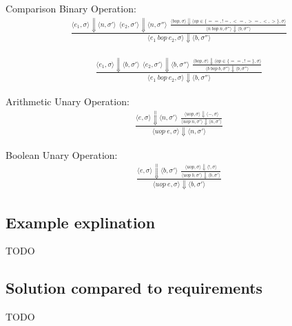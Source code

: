 \documentclass[12pt]{article}
\begin{document}
	Comparison Binary Operation:
	\begin{align*}
		\frac{
		\langle e_1, \sigma \rangle\Downarrow \langle n, \sigma' \rangle \ \ 
		\langle e_2, \sigma' \rangle\Downarrow \langle n, \sigma'' \rangle \ \
		\frac{
			\langle bop, \sigma \rangle\Downarrow \langle op \in \{==, !=, <=, >=, <, >\} , \sigma \rangle
		}{
			\langle n\ bop\ n, \sigma'' \rangle\Downarrow \langle b, \sigma'' \rangle
		}}
		{\langle e_1\ bop\ e_2, \sigma \rangle\Downarrow \langle b, \sigma'' \rangle}
	\end{align*}
	
	\begin{align*}
		\frac{
		\langle e_1, \sigma \rangle\Downarrow \langle b, \sigma' \rangle \ \ 
		\langle e_2, \sigma' \rangle\Downarrow \langle b, \sigma'' \rangle \ \
		\frac{
			\langle bop, \sigma \rangle\Downarrow \langle op \in \{==, !=\} , \sigma \rangle
		}{
			\langle b\ bop\ b, \sigma'' \rangle\Downarrow \langle b, \sigma'' \rangle
		}}
		{\langle e_1\ bop\ e_2, \sigma \rangle\Downarrow \langle b, \sigma'' \rangle}
	\end{align*}


	Arithmetic Unary Operation:
	\begin{align*}
		\frac{
		\langle e, \sigma \rangle\Downarrow \langle n, \sigma' \rangle \ \ 
		\frac{
			\langle uop, \sigma \rangle\Downarrow \langle -, \sigma \rangle
		}{
			\langle uop\ n, \sigma' \rangle\Downarrow \langle n, \sigma' \rangle
		}}
		{\langle uop\ e, \sigma \rangle\Downarrow \langle n, \sigma' \rangle}
	\end{align*}


	Boolean Unary Operation:
	\begin{align*}
		\frac{
		\langle e, \sigma \rangle\Downarrow \langle b, \sigma' \rangle \ \ 
		\frac{
			\langle uop, \sigma \rangle\Downarrow \langle !, \sigma \rangle
		}{
			\langle uop\ b, \sigma' \rangle\Downarrow \langle b, \sigma' \rangle
		}}
		{\langle uop\ e, \sigma \rangle\Downarrow \langle b, \sigma' \rangle}
	\end{align*}

	

		


	\subsection{Example explination}
 		TODO
    	
	\subsection{Solution compared to requirements}
 		TODO
    
\end{document}
